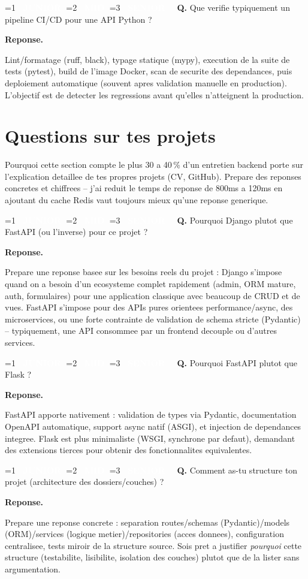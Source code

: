 \documentclass[11pt,a4paper]{article}
\newcommand{\badgeJ}{\textcolor{white}{\colorbox{junior}{\small\bfseries\ JUNIOR\ }}}
\newcommand{\badgeM}{\textcolor{white}{\colorbox{mid}{\small\bfseries\ MID\ }}}
\newcommand{\badgeS}{\textcolor{white}{\colorbox{senior}{\small\bfseries\ SENIOR\ }}}
\newcounter{qcount}
\newenvironment{qa}[2]{%
  \stepcounter{qcount}%
  \par\vspace{6pt}%
  \noindent\colorbox{qbg}{\parbox{\dimexpr\linewidth-12pt}{\vspace{2pt}%
  \ifnum#1=1 \badgeJ\fi\ifnum#1=2 \badgeM\fi\ifnum#1=3 \badgeS\fi
  \ \textbf{Q\theqcount.} #2\vspace{2pt}}}\par\vspace{4pt}%
  \noindent\textbf{\color{accent}Reponse.}\ \ignorespaces
}{%
  \par\vspace{8pt}%
}
\begin{document}
\begin{qa}{2}{Que verifie typiquement un pipeline CI/CD pour une API Python ?}
Lint/formatage (ruff, black), typage statique (mypy), execution de la suite
de tests (pytest), build de l'image Docker, scan de securite des dependances,
puis deploiement automatique (souvent apres validation manuelle en
production). L'objectif est de detecter les regressions avant qu'elles
n'atteignent la production.
\end{qa}

\newpage
\section{Questions sur tes projets}
\begin{infobox}{Pourquoi cette section compte le plus}
30 a 40\,\% d'un entretien backend porte sur l'explication detaillee de tes
propres projets (CV, GitHub). Prepare des reponses concretes et chiffrees --
\og{}j'ai reduit le temps de reponse de 800ms a 120ms en ajoutant du cache
Redis\fg{} vaut toujours mieux qu'une reponse generique.
\end{infobox}

\begin{qa}{2}{Pourquoi Django plutot que FastAPI (ou l'inverse) pour ce projet ?}
Prepare une reponse basee sur les besoins reels du projet : Django s'impose
quand on a besoin d'un ecosysteme complet rapidement (admin, ORM mature,
auth, formulaires) pour une application classique avec beaucoup de CRUD et
de vues. FastAPI s'impose pour des APIs pures orientees performance/async,
des microservices, ou une forte contrainte de validation de schema stricte
(Pydantic) -- typiquement, une API consommee par un frontend decouple ou
d'autres services.
\end{qa}

\begin{qa}{2}{Pourquoi FastAPI plutot que Flask ?}
FastAPI apporte nativement : validation de types via Pydantic, documentation
OpenAPI automatique, support async natif (ASGI), et injection de dependances
integree. Flask est plus minimaliste (WSGI, synchrone par defaut), demandant
des extensions tierces pour obtenir des fonctionnalites equivalentes.
\end{qa}

\begin{qa}{2}{Comment as-tu structure ton projet (architecture des dossiers/couches) ?}
Prepare une reponse concrete : separation routes/schemas (Pydantic)/models
(ORM)/services (logique metier)/repositories (acces donnees), configuration
centralisee, tests miroir de la structure source. Sois pret a justifier
\emph{pourquoi} cette structure (testabilite, lisibilite, isolation des
couches) plutot que de la lister sans argumentation.
\end{qa}
\end{document}
